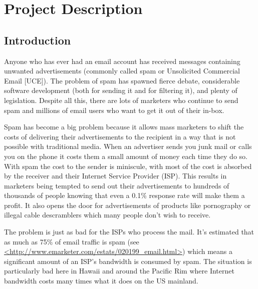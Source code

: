 
\setlength{\oddsidemargin}{0in}
\setlength{\textwidth}{7in}

\section{Project Description}

\subsection{Introduction}
Anyone who has ever had an email account has received messages containing
unwanted advertisements (commonly called spam or Unsolicited Commercial Email
[UCE]). The problem of spam has spawned fierce debate, considerable software
development (both for sending it and for filtering it), and plenty of
legislation. Despite all this, there are lots of marketers who continue to send
spam and millions of email users who want to get it out of their in-box.

Spam has become a big problem because it allows mass marketers to shift the
costs of delivering their advertisements to the recipient in a way that is not
possible with traditional media. When an advertiser sends you junk mail or
calls you on the phone it costs them a small amount of money each time they do
so. With spam the cost to the sender is miniscule, with most of the cost is
absorbed by the receiver and their Internet Service Provider (ISP). This
results in marketers being tempted to send out their advertisements to hundreds
of thousands of people knowing that even a 0.1\% response rate will make them a
profit. It also opens the door for advertisements of products like pornography
or illegal cable descramblers which many people don't wish to receive.

The problem is just as bad for the ISPs who process the mail. It's estimated
that as much as 75\% of email traffic is spam (see
\url{<http://www.emarketer.com/estats/020199_email.html>}) which means a
significant amount of an ISP's bandwidth is consumed by spam. The situation is
particularly bad here in Hawaii and around the Pacific Rim where Internet
bandwidth costs many times what it does on the US mainland.

